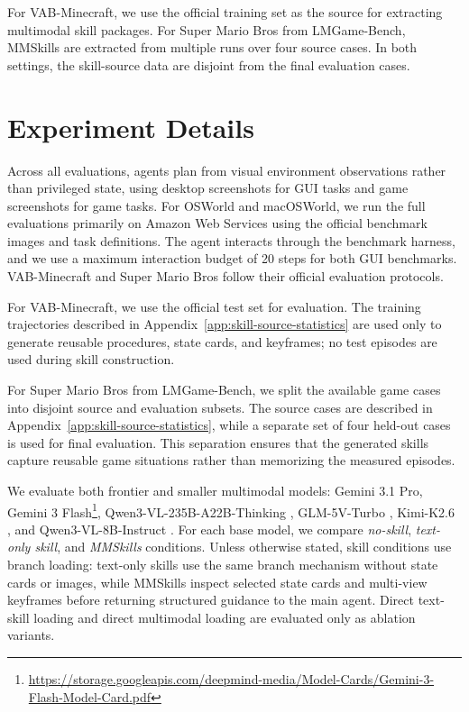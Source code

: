 \documentclass{llmxive}
\begin{document}
For VAB-Minecraft, we use the official training set as the source for extracting multimodal skill packages. For Super Mario Bros from LMGame-Bench, MMSkills are extracted from multiple runs over four source cases. In both settings, the skill-source data are disjoint from the final evaluation cases.

\section{Experiment Details}
\label{app:experiment-details}

Across all evaluations, agents plan from visual environment observations rather than privileged state, using desktop screenshots for GUI tasks and game screenshots for game tasks. For OSWorld and macOSWorld, we run the full evaluations primarily on Amazon Web Services using the official benchmark images and task definitions. The agent interacts through the benchmark harness, and we use a maximum interaction budget of 20 steps for both GUI benchmarks. VAB-Minecraft and Super Mario Bros follow their official evaluation protocols.

For VAB-Minecraft, we use the official test set for evaluation. The training trajectories described in Appendix~\ref{app:skill-source-statistics} are used only to generate reusable procedures, state cards, and keyframes; no test episodes are used during skill construction.

For Super Mario Bros from LMGame-Bench, we split the available game cases into disjoint source and evaluation subsets. The source cases are described in Appendix~\ref{app:skill-source-statistics}, while a separate set of four held-out cases is used for final evaluation. This separation ensures that the generated skills capture reusable game situations rather than memorizing the measured episodes.

We evaluate both frontier and smaller multimodal models: Gemini 3.1 Pro, Gemini 3 Flash\footnote{\url{https://storage.googleapis.com/deepmind-media/Model-Cards/Gemini-3-Flash-Model-Card.pdf}}, Qwen3-VL-235B-A22B-Thinking \citep{bai2025qwen3vltechnicalreport}, GLM-5V-Turbo \citep{vteam2026glm5vturbonativefoundationmodel}, Kimi-K2.6 \citep{kimiteam2026kimik25visualagentic}, and Qwen3-VL-8B-Instruct \citep{bai2025qwen3vltechnicalreport}. For each base model, we compare \emph{no-skill}, \emph{text-only skill}, and \emph{MMSkills} conditions. Unless otherwise stated, skill conditions use branch loading: text-only skills use the same branch mechanism without state cards or images, while MMSkills inspect selected state cards and multi-view keyframes before returning structured guidance to the main agent. Direct text-skill loading and direct multimodal loading are evaluated only as ablation variants.
\end{document}
